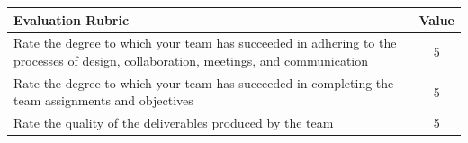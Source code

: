 \documentclass[12pt,a4paper]{article}
\begin{document}
\begin{table}[htp]
\footnotesize
\centering
\begin{tabulary}{\linewidth}{|L|c|}
\hline
{}Evaluation Rubric & Value \\
\hline
Rate the degree to which your team has succeeded in adhering to the processes of design, collaboration, meetings, and communication & 5 \\ %
\hline
Rate the degree to which your team has succeeded in completing the
team assignments and objectives & 5 \\ %
\hline
Rate the quality of the deliverables produced by the team & 5 \\ %
\hline
\end{tabulary}
\label{tab:team1}
\end{table}%
\end{document}
